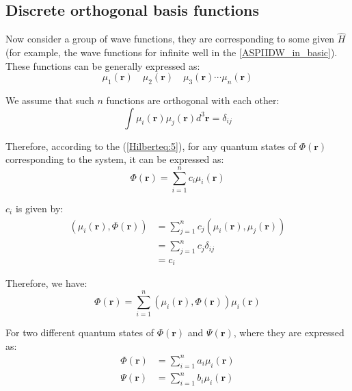 
\subsection{Discrete orthogonal basis functions}
\label{sec:DOBF_in_Hilbert_space}

Now consider a group of wave functions, they are corresponding to some
given $\hat{H}$ (for example, the wave functions for infinite well in
the \ref{ASPIIDW_in_basic}). These functions can be generally
expressed as:
\begin{equation}
\label{Hilberteq:11}
  \mu_{1}(\mathbf{r}) \quad  \mu_{2}(\mathbf{r}) \quad  \mu_{3}(\mathbf{r}) \cdots
\mu_{n}(\mathbf{r})
\end{equation}

We assume that such $n$ functions are orthogonal with each other:
\begin{equation}
  \int \mu_{i}(\mathbf{r}) \mu_{j}(\mathbf{r}) d^{3}\mathbf{r} = \delta_{ij}
\end{equation}

Therefore, according to the (\ref{Hilberteq:5}), for any quantum
states of $\Phi(\mathbf{r})$ corresponding to the system, it can be
expressed as:
\begin{equation}
\label{Hilberteq:3}
  \Phi(\mathbf{r}) = \sum_{i=1}^{n}c_{i}\mu_{i}(\mathbf{r})
\end{equation}

$c_{i}$ is given by:
\begin{align}
  (\mu_{i}(\mathbf{r}), \Phi(\mathbf{r})) &=
  \sum_{j=1}^{n}c_{j}(\mu_{i}(\mathbf{r}), \mu_{j}(\mathbf{r})) \nonumber
  \\
  &=\sum_{j=1}^{n}c_{j}\delta_{ij} \nonumber \\
  &=c_{i}
\end{align}

Therefore, we have:
\begin{equation}
  \Phi(\mathbf{r}) = \sum_{i=1}^{n}(\mu_{i}(\mathbf{r}),
  \Phi(\mathbf{r}))\mu_{i}(\mathbf{r})
\end{equation}

For two different quantum states of $\Phi(\mathbf{r})$ and
$\Psi(\mathbf{r})$, where they are expressed as:
\begin{align}
  \Phi(\mathbf{r}) &= \sum_{i=1}^{n}a_{i}\mu_{i}(\mathbf{r}) \nonumber \\
  \Psi(\mathbf{r}) &= \sum_{i=1}^{n}b_{i}\mu_{i}(\mathbf{r})
\end{align}

